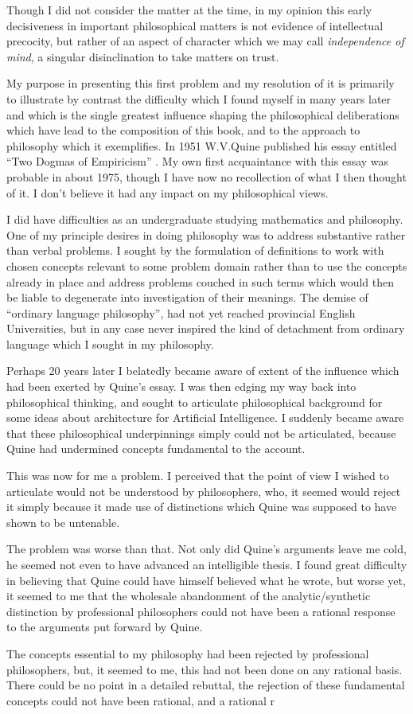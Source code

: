 {Though I did not consider the matter at the time, in my opinion this early decisiveness in important philosophical matters is not evidence of intellectual precocity, but rather of an aspect of character which we may call {\it independence of mind}, a singular disinclination to take matters on trust.

My purpose in presenting this first problem and my resolution of it is primarily to illustrate by contrast the difficulty which I found myself in many years later and which is the single greatest influence shaping the philosophical deliberations which have lead to the composition of this book, and to the approach to philosophy which it exemplifies.
In 1951 W.V.Quine published his essay entitled ``Two Dogmas of Empiricism'' \cite{quine51}.
My own first acquaintance with this essay was probable in about 1975, though I have now no recollection of what I then thought of it.
I don't believe it had any impact on my philosophical views.

I did have difficulties as an undergraduate studying mathematics and philosophy.
One of my principle desires in doing philosophy was to address substantive rather than verbal problems.
I sought by the formulation of definitions to work with chosen concepts relevant to some problem domain rather than to use the concepts already in place and address problems couched in such terms which would then be liable to degenerate into investigation of their meanings.
The demise of ``ordinary language philosophy'', had not yet reached provincial English Universities, but in any case never inspired the kind of detachment from ordinary language which I sought in my philosophy.

Perhaps 20 years later I belatedly became aware of extent of the influence which had been exerted by Quine's essay.
I was then edging my way back into philosophical thinking, and sought to articulate philosophical background for some ideas about architecture for Artificial Intelligence.
I suddenly became aware that these philosophical underpinnings simply could not be articulated, because Quine had undermined concepts fundamental to the account.

This was now for me a problem.
I perceived that the point of view I wished to articulate would not be understood by philosophers, who, it seemed would reject it simply because it made use of distinctions which Quine was supposed to have shown to be untenable.

The problem was worse than that.
Not only did Quine's arguments leave me cold, he seemed not even to have advanced an intelligible thesis.
I found great difficulty in believing that Quine could have himself believed what he wrote, but worse yet, it seemed to me that the wholesale abandonment of the analytic/synthetic distinction by professional philosophers could not have been a rational response to the arguments put forward by Quine.

The concepts essential to my philosophy had been rejected by professional philosophers, but, it seemed to me, this had not been done on any rational basis.
There could be no point in a detailed rebuttal, the rejection of these fundamental concepts could not have been rational, and a rational r

}
